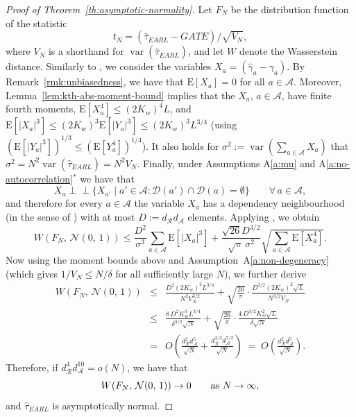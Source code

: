 \documentclass[sigconf]{acmart}
\newcommand{\E}{\mathrm E}
\newcommand{\ind}{\perp\!\!\!\perp}
\DeclareMathOperator{\var}{var}
\begin{document}
\begin{proof}[Proof of Theorem~\ref{th:asymptotic-normality}]
    Let $F_N$ be the distribution function of the statistic
    $$
        t_N = {(\hat\tau^{\phantom{1}}_{EARL} - GATE)}/\sqrt{V_N},
    $$
    where $V_N$ is a shorthand for $\var(\hat\tau^{\phantom{1}}_{EARL})$,
    and let $W$ denote the Wasserstein distance.
    Similarly to \cite[Theorem~4.3]{harshaw2023erl}, we consider the variables $X_a = (\hat\gamma_a-\gamma_a)$. By Remark~\ref{rmk:unbiasedness}, we have that $\E[X_a] = 0$ for all $a\in\mathcal{A}$. Moreover, Lemma~\ref{lem:kth-abs-moment-bound} implies that the $X_a$, $a\in\mathcal{A}$, have finite fourth moments, $\E[X_a^4]\le (2K_w)^4L$, and $\E[|X_a|^3]\le (2K_w)^3\E[|Y_a|^3] \le (2K_w)^3L^{3/4}$ (using $(\E[|Y_a|^3])^{1/3}\le (\E[Y_a^4])^{1/4}$). It also holds for $\sigma^2 := \var(\sum_{a\in\mathcal{A}}X_a)$ that $\sigma^2 = N^2\var(\hat\tau^{\phantom{1}}_{EARL})=N^2V_N$. Finally,
    under Assumptions A\ref{a:mu} and A\ref{a:no-autocorrelation}$^*$ we have that
    \begin{equation*}
        X_a \ind \{X_{a'}\mid a'\in\mathcal A\colon \mathcal D(a')\cap \mathcal D(a)=\emptyset\}\qquad\forall\,a\in\mathcal A,
    \end{equation*}
    and therefore for every $a\in\mathcal A$ the variable $X_a$ has a dependency neighbourhood (in the sense of \cite[Definition~3.1]{Ro:11}) with at most $D:=d_{\mathcal R}d_{\mathcal A}$ elements. Applying \cite[Theorem~3.5]{Ro:11}, we obtain
    \begin{equation*}
        W(F_N,\,\mathcal{N}(0,\,1)) \le \frac{D^2}{\sigma^3}\sum_{a\in\mathcal A}\E[|X_a|^3] + \frac{\sqrt{26}D^{3/2}}{\sqrt{\pi}\,\sigma^2}\sqrt{\sum_{a\in\mathcal A}\E[
        X_a^4]}.
    \end{equation*}
    Now using the moment bounds above and Assumption~A\ref{a:non-degeneracy} (which gives $1/V_N \le N/\delta$ for all sufficiently large $N$), we further derive
    \begin{eqnarray*}
        W(F_N,\,\mathcal{N}(0,\,1)) &\le&
        \frac{D^2(2K_w)^3L^{3/4}}{N^2V_N^{3/2}}
        + \sqrt{\frac{26}{\pi}}\cdot\frac{D^{3/2}(2K_w)^2\sqrt{L}}{N^{3/2}V_N}\\
        &\le&\frac{8\,D^2K_w^3L^{3/4}}{\delta^{3/2}\sqrt N}
        + \sqrt{\frac{26}{\pi}}\cdot\frac{4\,D^{3/2}K_w^2\sqrt{L}}{\delta\sqrt N}
        \\
        &=& O\left(\frac{d^2_{\mathcal R}d^5_{\mathcal A}}{\sqrt{N}} + \frac{d_{\mathcal R}^{3/2}d_{\mathcal A}^{7/2}}{\sqrt{N}}\right)
        \;=\; O\left(\frac{d^2_{\mathcal R}d^5_{\mathcal A}}{\sqrt{N}}\right)\!.
    \end{eqnarray*}
    Therefore, if $d^{4}_{\mathcal{R}}d^{10}_{\mathcal{A}}=o(N)$, we have that
    \begin{equation*}
    W(F_N,\,\mathcal{N}(0,\,1)) \to 0\qquad \textup{as }N\to\infty,
    \end{equation*}
    and $\hat\tau^{\phantom{1}}_{EARL}$ is asymptotically normal.
\end{proof}
\end{document}
